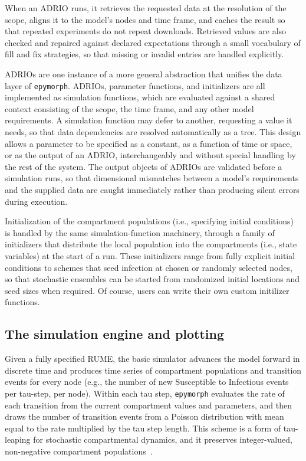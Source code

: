 When an ADRIO runs, it retrieves the requested data at the resolution of the scope, aligns it to the model's nodes and time frame, and caches the result so that repeated experiments do not repeat downloads. 
Retrieved values are also checked and repaired against declared expectations through a small vocabulary of fill and fix strategies, so that missing or invalid entries are handled explicitly.

ADRIOs are one instance of a more general abstraction that unifies the data layer of
\texttt{epymorph}. 
ADRIOs, parameter functions, and initializers are all implemented as simulation functions, which are evaluated against a shared context consisting of the scope, the time frame, and any other model requirements. 
A simulation function may defer to another, requesting a value it needs, so that data dependencies are resolved automatically as a tree. 
This design allows a parameter to be specified as a constant, as a function of time or space, or as the output of an ADRIO, interchangeably and without special handling by the rest of the system. 
The output objects of ADRIOs are validated before a simulation runs, so that dimensional mismatches between a model's requirements and the supplied data are caught immediately rather than producing silent errors during execution.

Initialization of the compartment populations (i.e., specifying initial conditions) is handled by the same simulation-function machinery, through a family of initializers that distribute the local population into the compartments (i.e., state variables) at the start of a run. 
These initializers range from fully explicit initial conditions to schemes that seed infection at chosen or randomly selected nodes, so that stochastic ensembles can be started from randomized initial locations and seed sizes when required.
Of course, users can write their own custom initilizer functions. 

\subsection{The simulation engine and plotting}

Given a fully specified RUME, the basic simulator advances the model forward in discrete time and produces time series of compartment populations and transition events for every node (e.g., the number of new Susceptible to Infectious events per tau-step, per node).
Within each tau step, \texttt{epymorph} evaluates the rate of each transition from the current compartment values and parameters, and then draws the number of transition events from a Poisson distribution with mean equal to the rate multiplied by the tau step length. 
This scheme is a form of tau-leaping for stochastic compartmental dynamics, and it preserves integer-valued, non-negative compartment populations~\citep{gillespie_exact_1977,gillespie_approximate_2001}.

